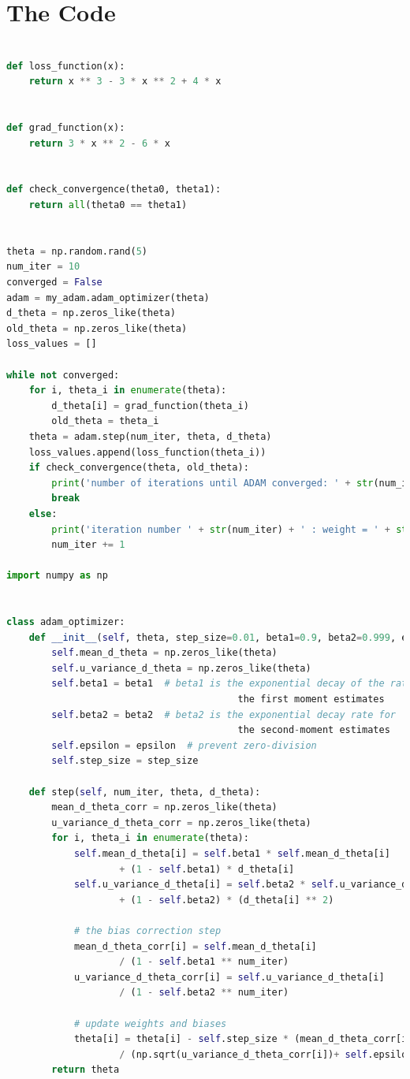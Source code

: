 \documentclass[10pt,a4paper]{article}
\begin{document}
\section{The Code}
\begin{lstlisting}[language=python]

def loss_function(x):
    return x ** 3 - 3 * x ** 2 + 4 * x


def grad_function(x):
    return 3 * x ** 2 - 6 * x


def check_convergence(theta0, theta1):
    return all(theta0 == theta1)


theta = np.random.rand(5)
num_iter = 10
converged = False
adam = my_adam.adam_optimizer(theta)
d_theta = np.zeros_like(theta)
old_theta = np.zeros_like(theta)
loss_values = []

while not converged:
    for i, theta_i in enumerate(theta):
        d_theta[i] = grad_function(theta_i)
        old_theta = theta_i
    theta = adam.step(num_iter, theta, d_theta)
    loss_values.append(loss_function(theta_i))
    if check_convergence(theta, old_theta):
        print('number of iterations until ADAM converged: ' + str(num_iter))
        break
    else:
        print('iteration number ' + str(num_iter) + ' : weight = ' + str(theta))
        num_iter += 1

import numpy as np


class adam_optimizer:
    def __init__(self, theta, step_size=0.01, beta1=0.9, beta2=0.999, epsilon=1e-8):
        self.mean_d_theta = np.zeros_like(theta)
        self.u_variance_d_theta = np.zeros_like(theta)
        self.beta1 = beta1  # beta1 is the exponential decay of the rate for
                                         the first moment estimates
        self.beta2 = beta2  # beta2 is the exponential decay rate for
                                         the second-moment estimates
        self.epsilon = epsilon  # prevent zero-division
        self.step_size = step_size

    def step(self, num_iter, theta, d_theta):
        mean_d_theta_corr = np.zeros_like(theta)
        u_variance_d_theta_corr = np.zeros_like(theta)
        for i, theta_i in enumerate(theta):
            self.mean_d_theta[i] = self.beta1 * self.mean_d_theta[i]
                    + (1 - self.beta1) * d_theta[i]
            self.u_variance_d_theta[i] = self.beta2 * self.u_variance_d_theta[i] 
                    + (1 - self.beta2) * (d_theta[i] ** 2)

            # the bias correction step
            mean_d_theta_corr[i] = self.mean_d_theta[i] 
                    / (1 - self.beta1 ** num_iter)
            u_variance_d_theta_corr[i] = self.u_variance_d_theta[i] 
                    / (1 - self.beta2 ** num_iter)

            # update weights and biases
            theta[i] = theta[i] - self.step_size * (mean_d_theta_corr[i] 
                    / (np.sqrt(u_variance_d_theta_corr[i])+ self.epsilon))
        return theta

\end{lstlisting}
\end{document}
